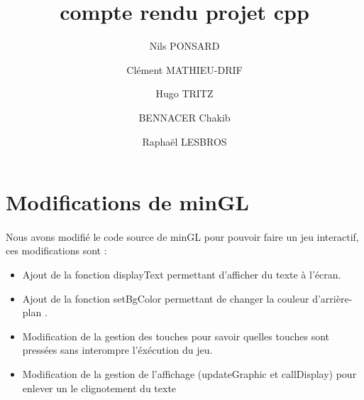 \documentclass{article}
\begin{document}
\author{Nils PONSARD \and Clément MATHIEU-DRIF \and
Hugo TRITZ \and BENNACER Chakib \and
Raphaël LESBROS}
\title{compte rendu projet cpp}
\maketitle
\section{Modifications de minGL}
\paragraph{} Nous avons modifié le code source de minGL pour pouvoir faire un jeu interactif, ces modifications sont :
\begin{itemize}
    \item Ajout de la fonction displayText permettant d'afficher du texte à l'écran.
    \item Ajout de la fonction setBgColor permettant de changer la couleur d'arrière-plan .
    \item Modification de la gestion des touches pour savoir quelles touches sont pressées sans interompre l'éxécution du jeu.
    \item Modification de la gestion de l'affichage (updateGraphic et callDisplay) pour enlever un le clignotement du texte 
    
\end{itemize}
\end{document}
